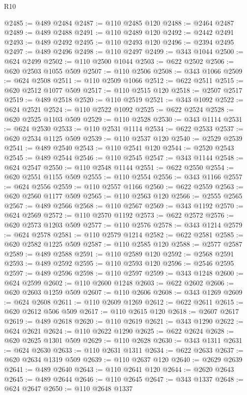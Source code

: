 \begin{lexlean}{R10}
\begin{coremodule}
@2485 := @489 @2484
@2487 := @110 @2485 @120
@2488 := @2464 @2487
@2489 := @489 @2488
@2491 := @110 @2489 @120
@2492 := @2442 @2491
@2493 := @489 @2492
@2495 := @110 @2493 @120
@2496 := @2394 @2495
@2497 := @489 @2496
@2498 := @110 @2497
@2499 := @343 @1044
@2500 := @624 @2499
@2502 := @110 @2500 @1044
@2503 := @622 @2502
@2506 := @620 @2503 @1055 @509
@2507 := @110 @2506
@2508 := @343 @1066
@2509 := @624 @2508
@2511 := @110 @2509 @1066
@2512 := @622 @2511
@2515 := @620 @2512 @1077 @509
@2517 := @110 @2515 @120
@2518 := @2507 @2517
@2519 := @489 @2518
@2520 := @110 @2519
@2521 := @343 @1092
@2522 := @624 @2521
@2524 := @110 @2522 @1092
@2525 := @622 @2524
@2528 := @620 @2525 @1103 @509
@2529 := @110 @2528
@2530 := @343 @1114
@2531 := @624 @2530
@2533 := @110 @2531 @1114
@2534 := @622 @2533
@2537 := @620 @2534 @1125 @509
@2539 := @110 @2537 @120
@2540 := @2529 @2539
@2541 := @489 @2540
@2543 := @110 @2541 @120
@2544 := @2520 @2543
@2545 := @489 @2544
@2546 := @110 @2545
@2547 := @343 @1144
@2548 := @624 @2547
@2550 := @110 @2548 @1144
@2551 := @622 @2550
@2554 := @620 @2551 @1155 @509
@2555 := @110 @2554
@2556 := @343 @1166
@2557 := @624 @2556
@2559 := @110 @2557 @1166
@2560 := @622 @2559
@2563 := @620 @2560 @1177 @509
@2565 := @110 @2563 @120
@2566 := @2555 @2565
@2567 := @489 @2566
@2568 := @110 @2567
@2569 := @343 @1192
@2570 := @624 @2569
@2572 := @110 @2570 @1192
@2573 := @622 @2572
@2576 := @620 @2573 @1203 @509
@2577 := @110 @2576
@2578 := @343 @1214
@2579 := @624 @2578
@2581 := @110 @2579 @1214
@2582 := @622 @2581
@2585 := @620 @2582 @1225 @509
@2587 := @110 @2585 @120
@2588 := @2577 @2587
@2589 := @489 @2588
@2591 := @110 @2589 @120
@2592 := @2568 @2591
@2593 := @489 @2592
@2595 := @110 @2593 @120
@2596 := @2546 @2595
@2597 := @489 @2596
@2598 := @110 @2597
@2599 := @343 @1248
@2600 := @624 @2599
@2602 := @110 @2600 @1248
@2603 := @622 @2602
@2606 := @620 @2603 @1259 @509
@2607 := @110 @2606
@2608 := @343 @1269
@2609 := @624 @2608
@2611 := @110 @2609 @1269
@2612 := @622 @2611
@2615 := @620 @2612 @506 @509
@2617 := @110 @2615 @120
@2618 := @2607 @2617
@2619 := @489 @2618
@2620 := @110 @2619
@2621 := @343 @1290
@2622 := @624 @2621
@2624 := @110 @2622 @1290
@2625 := @622 @2624
@2628 := @620 @2625 @1301 @509
@2629 := @110 @2628
@2630 := @343 @1311
@2631 := @624 @2630
@2633 := @110 @2631 @1311
@2634 := @622 @2633
@2637 := @620 @2634 @1319 @509
@2639 := @110 @2637 @120
@2640 := @2629 @2639
@2641 := @489 @2640
@2643 := @110 @2641 @120
@2644 := @2620 @2643
@2645 := @489 @2644
@2646 := @110 @2645
@2647 := @343 @1337
@2648 := @624 @2647
@2650 := @110 @2648 @1337

\end{coremodule}
\end{lexlean}

